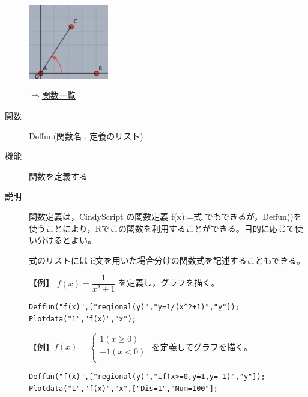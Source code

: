 \documentclass[papersize,a4paper,10pt,uplatex]{jsarticle}
\begin{document}
\begin{description}
\vspace{\baselineskip}
\hspace{20mm}%
\includegraphics[width=35mm,bb=0.00 0.00 176.00 165.00]{Fig/anglearrowscreen.pdf}%
\hspace{20mm}\scalebox{0.5}{}


\begin{flushright}\hyperlink{functionlist}{$\Rightarrow$関数一覧}\end{flushright}

\newpage

\vspace{\baselineskip}
\hypertarget{deffun}{}
\item[関数]Deffun(関数名 , 定義のリスト)
\item[機能]関数を定義する
\item[説明]関数定義は，CindyScript の関数定義 f(x):=式 でもできるが，Deffun()を使うことにより，Rでこの関数を利用することができる。目的に応じて使い分けるとよい。

式のリストには if文を用いた場合分けの関数式を記述することもできる。

\vspace{\baselineskip}
【例】
$f(x)=\dfrac{1}{x^2+1}$ を定義し，グラフを描く。

\begin{verbatim}
Deffun("f(x)",["regional(y)","y=1/(x^2+1)","y"]);
Plotdata("1","f(x)","x");
\end{verbatim}

\vspace{\baselineskip}
\hspace{20mm}\scalebox{0.9}{}


\vspace{\baselineskip}
【例】$f(x)=\left\{\begin{array}{l}1　 (x\geq 0)\\ -1 　 (x<0)\\ \end{array}\right.$ を定義してグラフを描く。

\begin{verbatim}
Deffun("f(x)",["regional(y)","if(x>=0,y=1,y=-1)","y"]);
Plotdata("1","f(x)","x",["Dis=1","Num=100"];
\end{verbatim}


\end{description}
\end{document}
